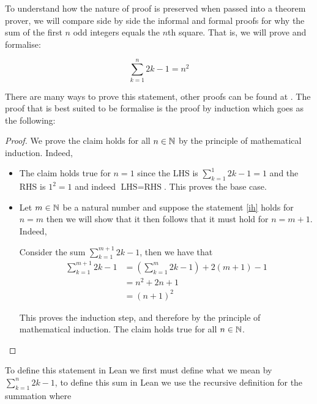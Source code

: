 \begin{example}
    To understand how the nature of proof is preserved when passed into a theorem prover, we will compare side by side the informal and formal proofs 
    for why the sum of the first $n$ odd integers equals the $n$th square. That is, we will prove and formalise:

    \begin{equation}
        \label{ih}
        \sum_{k = 1}^{n} 2k - 1 = n^2
    \end{equation}

    There are many ways to prove this statement, other proofs can be found at \cite{sangwin}. The proof that is best suited to be formalise is the
    proof by induction which goes as the following:

    \begin{proof}
        We prove the claim holds for all $n \in \mathbb{N}$ by the principle of mathematical induction. Indeed,

        \begin{itemize}
            \item The claim holds true for $n = 1$ since the LHS is $\sum_{k = 1}^{1} 2k -1 = 1$ and the RHS is $1^2 = 1$ and indeed $\textrm{LHS} = \textrm{RHS}$. This proves the base case.
            
            \item Let $m \in \mathbb{N}$ be a natural number and suppose the statement \eqref{ih} holds for $n = m$ then we will show that it then follows that it must hold for $n = m + 1$. Indeed,
            
            Consider the sum $\sum_{k = 1}^{m + 1} 2k - 1$, then we have that
            \begin{align}
                \sum_{k = 1}^{m + 1} 2k - 1 &= \left(\sum_{k = 1}^{m} 2k - 1\right) + 2(m + 1) - 1 \tag{by definition of the summation}\\
                    &=  n^2 + 2n + 1 \tag{by the induction hypothesis}\\
                    &= (n + 1)^2
            \end{align}

            This proves the induction step, and therefore by the principle of mathematical induction. The claim holds true for all $n \in \mathbb{N}$.
        \end{itemize}
    \end{proof}

    To define this statement in Lean we first must define what we mean by $\sum_{k = 1}^{n} 2k - 1$, to define this sum in Lean we use the recursive definition
    for the summation where 


\end{example}

